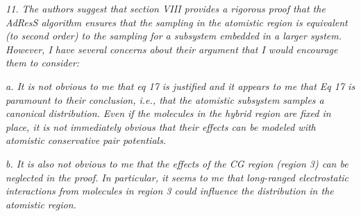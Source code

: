 \documentclass[a4paper]{article}
\begin{document}
\textit{
11. The authors suggest that section VIII provides a rigorous proof
that the AdResS algorithm ensures that the sampling in the atomistic
region is equivalent (to second order) to the sampling for a subsystem
embedded in a larger system. However, I have several concerns about
their argument that I would encourage them to consider:
}

\textit{
a. It is not obvious to me that eq 17 is justified and it appears to
me that Eq 17 is paramount to their conclusion, i.e., that the
atomistic subsystem samples a canonical distribution. Even if the
molecules in the hybrid region are fixed in place, it is not
immediately obvious that their effects can be modeled with atomistic
conservative pair potentials.
}

\textit{
b. It is also not obvious to me that the effects of the CG region
(region 3) can be neglected in the proof. In particular, it seems to
me that long-ranged electrostatic interactions from molecules in
region 3 could influence the distribution in the atomistic region.
}
\end{document}
